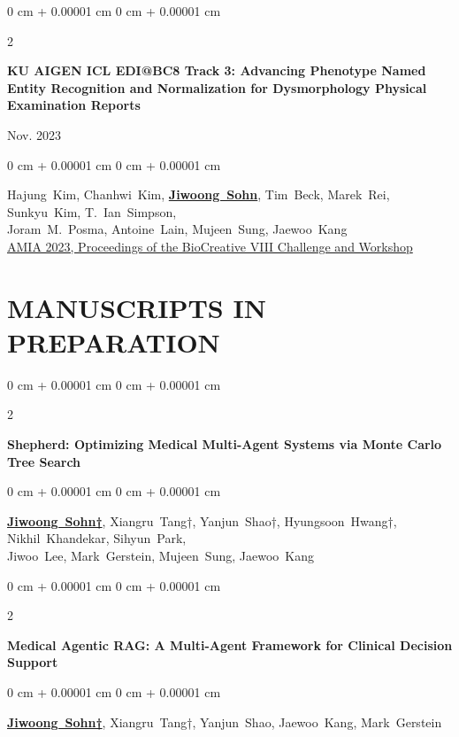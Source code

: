 \documentclass[10pt, letterpaper]{article}
\newenvironment{onecolentry}{
    \begin{adjustwidth}{
        0 cm + 0.00001 cm
    }{
        0 cm + 0.00001 cm
    }
}{
    \end{adjustwidth}
} %
\newenvironment{twocolentry}[2][]{
    \onecolentry
    \def\secondColumn{#2}
    \setcolumnwidth{\fill, 3.5 cm}
    \begin{paracol}{2}
}{
    \switchcolumn \raggedleft \secondColumn
    \end{paracol}
    \endonecolentry
} %
\begin{document}
       \begin{twocolentry}
            {
                Nov. 2023
            }
            {
                \textbf{KU AIGEN ICL EDI@BC8 Track 3: Advancing Phenotype Named Entity Recognition and Normalization for Dysmorphology Physical Examination Reports}
            }
    \end{twocolentry}           
        \begin{onecolentry}
                \mbox{Hajung Kim},
                \mbox{Chanhwi Kim},
                \mbox{\textbf{\underline{Jiwoong Sohn}}}, \mbox{Tim Beck}, 
                \mbox{Marek Rei},
                \mbox{Sunkyu Kim},
                \mbox{T. Ian Simpson}, \\
                \mbox{Joram M. Posma},
                \mbox{Antoine Lain},
                \mbox{Mujeen Sung},
                \mbox{Jaewoo Kang}
                \\
        \href{https://spiral.imperial.ac.uk/handle/10044/1/108095}{AMIA 2023, Proceedings of the BioCreative VIII Challenge and Workshop}
    \end{onecolentry}
    \vspace{0.3 cm}

\section{MANUSCRIPTS IN PREPARATION}
\vspace{0.2 cm}
       \begin{twocolentry}
            {
                2025
            }
            {
                \textbf{Shepherd: Optimizing Medical Multi-Agent Systems via Monte Carlo Tree Search}
            }
        \end{twocolentry}           
        \begin{onecolentry}
                \mbox{\textbf{\underline{Jiwoong Sohn†}}}, \mbox{Xiangru Tang†}, \mbox{Yanjun Shao†}, \mbox{Hyungsoon Hwang†}, \mbox{Nikhil Khandekar}, \mbox{Sihyun Park}, \\
                \mbox{Jiwoo Lee}, \mbox{Mark Gerstein}, \mbox{Mujeen Sung}, \mbox{Jaewoo Kang}
        \end{onecolentry}
    \vspace{0.3 cm}

       \begin{twocolentry}
            {
                2025
            }
            {
                \textbf{Medical Agentic RAG: A Multi-Agent Framework for Clinical Decision Support}
            }
        \end{twocolentry}           
        \begin{onecolentry}
                \mbox{\textbf{\underline{Jiwoong Sohn†}}}, \mbox{Xiangru Tang†}, \mbox{Yanjun Shao}, \mbox{Jaewoo Kang}, \mbox{Mark Gerstein}
        \end{onecolentry}
    \vspace{0.3 cm}
\end{document}
